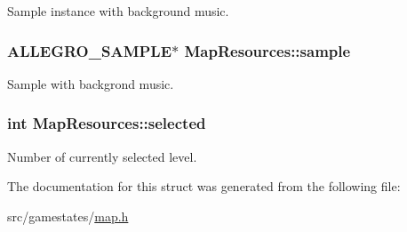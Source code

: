 Sample instance with background music. \hypertarget{structMapResources_a3bdd93c64d58e018e48c4ac220fd85dd}{
\subsubsection[{sample}]{\setlength{\rightskip}{0pt plus 5cm}A\+L\+L\+E\+G\+R\+O\+\_\+\+S\+A\+M\+P\+L\+E$\ast$ Map\+Resources\+::sample}}\label{structMapResources_a3bdd93c64d58e018e48c4ac220fd85dd}
Sample with backgrond music. \hypertarget{structMapResources_a4ab1ed730044bd56cf036371c0ef9cfe}{
\subsubsection[{selected}]{\setlength{\rightskip}{0pt plus 5cm}int Map\+Resources\+::selected}}\label{structMapResources_a4ab1ed730044bd56cf036371c0ef9cfe}
Number of currently selected level. 

The documentation for this struct was generated from the following file\+:\begin{DoxyCompactItemize}
\item 
src/gamestates/\hyperlink{map_8h}{map.\+h}\end{DoxyCompactItemize}
